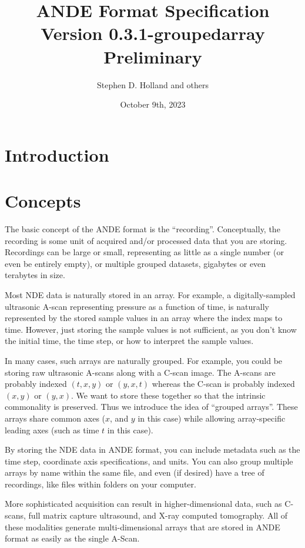 \documentclass{article}
\title{ANDE Format Specification Version 0.3.1-groupedarray Preliminary}
\author{Stephen D. Holland and others}
\date{October 9th, 2023}
\begin{document}
\maketitle

\section{Introduction}

\section{Concepts}

The basic concept of the ANDE format is the ``recording''. Conceptually, the recording is some unit of acquired and/or processed data that you are storing. Recordings can be large or small, representing as little as a single number (or even be entirely empty), or multiple grouped datasets, gigabytes or even terabytes in size.

Most NDE data is naturally stored in an array. For example, a digitally-sampled ultrasonic A-scan representing pressure as a function of time, is naturally represented by the stored sample values in an array where the index maps to time. However, just storing the sample values is not sufficient, as you don't know the initial time, the time step, or how to interpret the sample values.

In many cases, such arrays are naturally grouped. For example, you could be storing raw ultrasonic A-scans along with a C-scan image. The A-scans are probably indexed $(t,x,y)$ or $(y,x,t)$ whereas the C-scan is probably indexed $(x,y)$ or $(y,x)$. We want to store these together so that the intrinsic commonality is preserved. Thus we introduce the idea of ``grouped arrays''. These arrays share common axes ($x$, and $y$ in this case) while allowing array-specific leading axes (such as time $t$ in this case). 

By storing the NDE data in ANDE format, you can include metadata such as the time step, coordinate axis specifications, and units. You can also group multiple arrays by name within the same file, and even (if desired) have a tree of recordings, like files within folders on your computer.

More sophisticated acquisition can result in higher-dimensional data, such as C-scans, full matrix capture ultrasound, and X-ray computed tomography. All of these modalities generate multi-dimensional arrays that are stored in ANDE format as easily as the single A-Scan.
\end{document}
